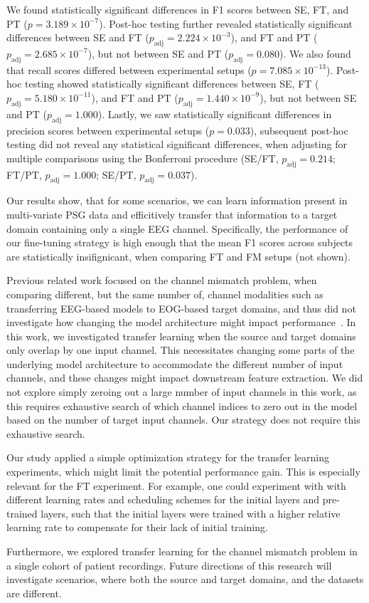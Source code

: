 We found statistically significant differences in F1 scores between SE, FT, and PT ($p=3.189\times 10^{-7}$). 
Post-hoc testing further revealed statistically significant differences between SE and FT ($p_{\mathrm{adj}}=2.224 \times 10^{-3}$), and FT and PT ($p_{\mathrm{adj}}=2.685 \times 10^{-7}$), but not between SE and PT  ($p_{\mathrm{adj}}=0.080$). 
We also found that recall scores differed between experimental setups ($p=7.085 \times 10^{-13}$).
Post-hoc testing showed statistically significant differences between SE, FT ($p_{\mathrm{adj}}=5.180 \times 10^{-11}$), and FT and PT ($p_{\mathrm{adj}}=1.440 \times 10^{-9}$), but not between SE and PT ($p_{\mathrm{adj}}=1.000$).
Lastly, we saw statistically significant differences in precision scores between experimental setups ($p=0.033$), subsequent post-hoc testing did not reveal any statistical significant differences, when adjusting for multiple comparisons using the Bonferroni procedure (SE/FT, $p_{\mathrm{adj}}=0.214$; FT/PT, $p_{\mathrm{adj}}=1.000$; SE/PT, $p_{\mathrm{adj}}=0.037$).

Our results show, that for some scenarios, we can learn information present in multi-variate PSG data and efficitively transfer that information to a target domain containing only a single EEG channel.
Specifically, the performance of our fine-tuning strategy is high enough that the mean F1 scores across subjects are statistically insifignicant, when comparing FT and FM setups (not shown).

Previous related work focused on the channel mismatch problem, when comparing different, but the same number of, channel modalities such as transferring EEG-based models to EOG-based target domains, and thus did not investigate how changing the model architecture might impact performance~\cite{Phan2019, Phan2019c}.
In this work, we investigated transfer learning when the source and target domains only overlap by one input channel.
This necessitates changing some parts of the underlying model architecture to accommodate the different number of input channels, and these changes might impact downstream feature extraction.
We did not explore simply zeroing out a large number of input channels in this work, as this requires exhaustive search of which channel indices to zero out in the model based on the number of target input channels. 
Our strategy does not require this exhaustive search.

Our study applied a simple optimization strategy for the transfer learning experiments, which might limit the potential performance gain.
This is especially relevant for the FT experiment. 
For example, one could experiment with with different learning rates and scheduling schemes for the initial layers and pre-trained layers, such that the initial layers were trained with a higher relative learning rate to compensate for their lack of initial training.

Furthermore, we explored transfer learning for the channel mismatch problem in a single cohort of patient recordings. 
Future directions of this research will investigate scenarios, where both the source and target domains, and the datasets are different.